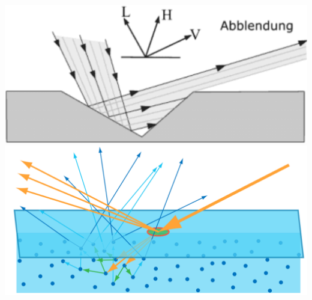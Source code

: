 \documentclass[
  11pt,
  a4paper,
  oneside
  ]{article}
\begin{document}
\includegraphics*[width=0.9 \textwidth]{images/abblendung.png}\\
\includegraphics*[width=0.9 \textwidth]{images/scattering.png}\\






\end{document}
